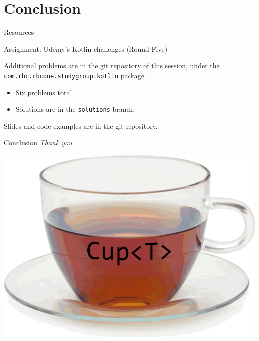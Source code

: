 \documentclass[xcolor=pdftex,dvipsnames,table]{beamer}
\newenvironment{wideitemize}{\itemize\addtolength{\itemsep}{5pt}}{\enditemize}
\begin{document}
\section{Conclusion}

\begin{frame}[fragile]{Resources}
  \begin{wideitemize}
    \item Assignment: Udemy's Kotlin challenges (Round Five)
    \item Additional problems are in the git repository of this session, under the \verb|com.rbc.rbcone.studygroup.kotlin| package.
    \begin{itemize}
      \item Six problems total.
      \item Solutions are in the \verb|solutions| branch.
    \end{itemize}
    \item Slides and code examples are in the git repository.
  \end{wideitemize}
\end{frame}

\begin{frame}[fragile]{Conclusion}
  \centering
  \vspace{25pt} 
  \LARGE
  \emph{Thank you}
  \small
  \vspace{5pt}
  \begin{center}
    \includegraphics[height=0.5\textheight,keepaspectratio]{images/cup-of-t}
  \end{center}
\end{frame}

\end{document}
